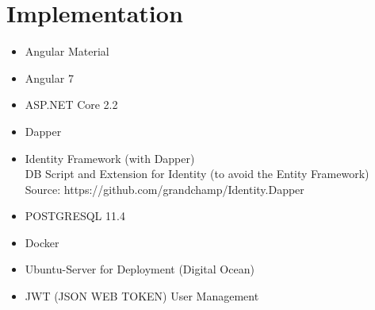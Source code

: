 \section{Implementation}
\begin{itemize}
\item Angular Material
\item Angular 7
\item ASP.NET Core 2.2
\item Dapper
\item Identity Framework (with Dapper) \\
DB Script and Extension for Identity (to avoid the Entity Framework) Source: https://github.com/grandchamp/Identity.Dapper
\item POSTGRESQL 11.4
\item Docker
\item Ubuntu-Server for Deployment (Digital Ocean)
\item JWT (JSON WEB TOKEN) User Management
\end{itemize}
